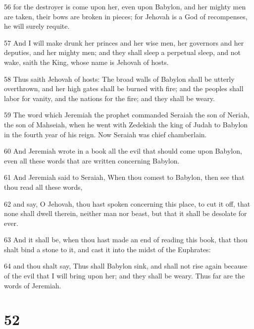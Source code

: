 \par 56 for the destroyer is come upon her, even upon Babylon, and her mighty men are taken, their bows are broken in pieces; for Jehovah is a God of recompenses, he will surely requite.
\par 57 And I will make drunk her princes and her wise men, her governors and her deputies, and her mighty men; and they shall sleep a perpetual sleep, and not wake, saith the King, whose name is Jehovah of hosts.
\par 58 Thus saith Jehovah of hosts: The broad walls of Babylon shall be utterly overthrown, and her high gates shall be burned with fire; and the peoples shall labor for vanity, and the nations for the fire; and they shall be weary.
\par 59 The word which Jeremiah the prophet commanded Seraiah the son of Neriah, the son of Mahseiah, when he went with Zedekiah the king of Judah to Babylon in the fourth year of his reign. Now Seraiah was chief chamberlain.
\par 60 And Jeremiah wrote in a book all the evil that should come upon Babylon, even all these words that are written concerning Babylon.
\par 61 And Jeremiah said to Seraiah, When thou comest to Babylon, then see that thou read all these words,
\par 62 and say, O Jehovah, thou hast spoken concerning this place, to cut it off, that none shall dwell therein, neither man nor beast, but that it shall be desolate for ever.
\par 63 And it shall be, when thou hast made an end of reading this book, that thou shalt bind a stone to it, and cast it into the midst of the Euphrates:
\par 64 and thou shalt say, Thus shall Babylon sink, and shall not rise again because of the evil that I will bring upon her; and they shall be weary. Thus far are the words of Jeremiah.

\chapter{52}

